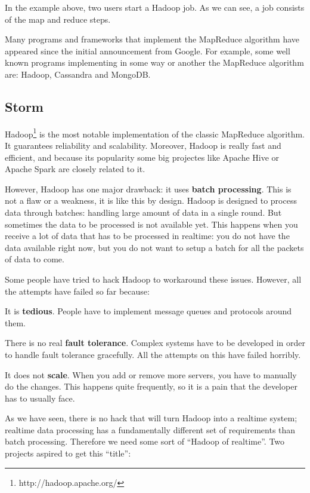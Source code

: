 In the example above, two users start a Hadoop job. As we can see, a job
consists of the map and reduce steps.

Many programs and frameworks that implement the MapReduce algorithm have
appeared since the initial announcement from Google. For example, some
well known programs implementing in some way or another the MapReduce algorithm
are: Hadoop, Cassandra and MongoDB.

\subsection{Storm}
\label{sec:state_storm}

Hadoop\footnote{http://hadoop.apache.org/} is the most notable implementation of
the classic MapReduce algorithm. It guarantees reliability and scalability.
Moreover, Hadoop is really fast and efficient, and because its popularity some
big projectes like Apache Hive or Apache Spark are closely related to it.

However, Hadoop has one major drawback: it uses {\bf batch processing}. This is
not a flaw or a weakness, it is like this by design. Hadoop is designed to
process data through batches: handling large amount of data in a single round.
But sometimes the data to be processed is not available yet. This happens when
you receive a lot of data that has to be processed in realtime: you do not have
the data available right now, but you do not want to setup a batch for all the
packets of data to come.

Some people have tried to hack Hadoop to workaround these issues. However, all
the attempts have failed so far because:

\mylist
  \item It is {\bf tedious}. People have to implement message queues and
protocols around them.
  \item There is no real {\bf fault tolerance}. Complex systems have to be
developed in order to handle fault tolerance gracefully. All the attempts on
this have failed horribly.
  \item It does not {\bf scale}. When you add or remove more servers, you have
to manually do the changes. This happens quite frequently, so it is a pain that
the developer has to usually face.
\mylistend

As we have seen, there is no hack that will turn Hadoop into a
realtime system; realtime data processing has a fundamentally different set of
requirements than batch processing. Therefore we need some sort of ``Hadoop of
realtime''. Two projects aspired to get this ``title'':

